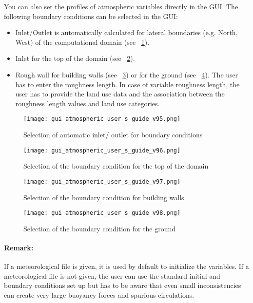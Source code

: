 {{You can also set the profiles of atmospheric variables directly in the GUI.
The following boundary conditions can be selected in the GUI:
%
\begin{itemize}
\item Inlet/Outlet is automatically calculated for lateral boundaries
(e.g. North, West\textellipsis ) of the computational domain
(see \figurename~\ref{fig:inlet}).
\item Inlet for the top of the domain (see \figurename~\ref{fig:top}).
\item Rough wall for building walls (see \figurename~\ref{fig:walls}) or for
the ground (see \figurename~\ref{fig:ground}).
The user has to enter the roughness length. In case of variable roughness
length, the user has to provide the land use data and the association
between the roughness length values and land use categories.
\end{itemize}
%
\begin{figure}[htbp]
\centerline{\texttt{[image: gui\_atmospheric\_user\_s\_guide\_v95.png]}}
\caption{Selection of automatic inlet/ outlet for boundary conditions }
\label{fig:inlet}
\end{figure}
%
\begin{figure}[htbp]
\centerline{\texttt{[image: gui\_atmospheric\_user\_s\_guide\_v96.png]}}
\caption{Selection of the boundary condition for the top of the domain }
\label{fig:top}
\end{figure}
%
\begin{figure}[htbp]
\centerline{\texttt{[image: gui\_atmospheric\_user\_s\_guide\_v97.png]}}
\caption{Selection of the boundary condition for building walls}
\label{fig:walls}
\end{figure}
%
\begin{figure}[htbp]
\centerline{\texttt{[image: gui\_atmospheric\_user\_s\_guide\_v98.png]}}
\caption{Selection of the boundary condition for the ground}
\label{fig:ground}
\end{figure}

\paragraph{Remark:} If a meteorological file is given, it is used by default to
initialize the variables. If a meteorological file is not given, the user can
use the standard \CS initial and boundary conditions set up but has to be aware
that even small inconsistencies can create very large buoyancy forces and
spurious circulations.

}}
